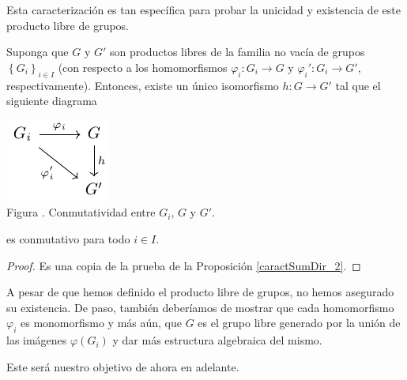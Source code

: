 \documentclass[12pt]{report}
\theoremstyle{largebreak}
\newcommand\cf[3]{\ensuremath{#1:#2\rightarrow#3}}
\newcounter{figcount}
\begin{document}
    Esta caracterización es tan específica para probar la unicidad y existencia de este producto libre de grupos.

    \begin{propo}
        Suponga que $G$ y $G'$ son productos libres de la familia no vacía de grupos $\left\{G_i \right\}_{ i\in I}$ (con respecto a los homomorfismos $\cf{\varphi_i}{G_i}{G}$ y $\cf{\varphi_i'}{G_i}{G'}$, respectivamente). Entonces, existe un único isomorfismo $\cf{h}{G}{G'}$ tal que el siguiente diagrama

        \begin{minipage}{\textwidth}
            \begin{center}
                \includegraphics[scale=1.5]{images/fig_11.pdf}\\
                Figura \thefigcount. Conmutatividad entre $G_i$, $G$ y $G'$.
            \end{center}
        \end{minipage}

        es conmutativo para todo $i\in I$.
    \end{propo}

    \begin{proof}
        Es una copia de la prueba de la Proposición \ref{caractSumDir_2}. 
    \end{proof}

    A pesar de que hemos definido el producto libre de grupos, no hemos asegurado su existencia. De paso, también deberíamos de mostrar que cada homomorfismo $\varphi_i$ es monomorfismo y más aún, que $G$ es el grupo libre generado por la unión de las imágenes $\varphi(G_i)$ y dar más estructura algebraica del mismo.

    Este será nuestro objetivo de ahora en adelante.
\end{document}
